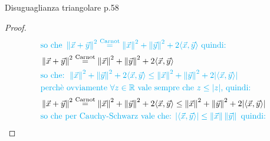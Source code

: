\documentclass{article}  %
\begin{document}
\begin{theorem}{Disuguaglianza triangolare p.58}
\begin{proof}
\begin{align*}
			 & \textcolor{cyan}{\text{so che }\left\|\vec{x}+\vec{y}\right\|^2 \overset{\text{Carnot}}{=} \left\|\vec{x}\right\|^2+\left\|\vec{y}\right\|^2+2\langle \vec{x}, \vec{y} \rangle}
			\textcolor{cyan}{\text{ quindi: }}                                                                                                                                                                                                                                                                                                                                                    \\
			 & \left\|\vec{x}+\vec{y}\right\|^2 \overset{\text{Carnot}}{=} \left\|\vec{x}\right\|^2+\left\|\vec{y}\right\|^2+2\langle \vec{x}, \vec{y} \rangle                                                                                                                                                                                                                                    \\
			 & \textcolor{cyan}{\text{so che: } \left\|\vec{x}\right\|^2+\left\|\vec{y}\right\|^2+2\langle \vec{x}, \vec{y} \rangle \leq \left\|\vec{x}\right\|^2+\left\|\vec{y}\right\|^2+2 |\langle \vec{x}, \vec{y} \rangle|}                                                                                                                                                                  \\
			 & \textcolor{cyan}{\text{perchè ovviamente } \forall{z} \in \mathbb{R} \text{ vale sempre che } z \leq |z| \text{, quindi:}}                                                                                                                                                                                                                                                         \\
			 & \left\|\vec{x}+\vec{y}\right\|^2 \overset{\text{Carnot}}{=} \left\|\vec{x}\right\|^2+\left\|\vec{y}\right\|^2+2\langle \vec{x}, \vec{y} \rangle \leq \left\|\vec{x}\right\|^2+\left\|\vec{y}\right\|^2+2 |\langle \vec{x}, \vec{y} \rangle|                                                                                                                                        \\
			 & \textcolor{cyan}{\text{so che per Cauchy-Schwarz vale che: } |\langle \vec{x}, \vec{y} \rangle| \leq \left\|\vec{x}\right\| \left\|\vec{y}\right\| \text{ quindi:}}                                                                                                                                                                                                                \\

\end{align*}
\end{proof}
\end{theorem}
\end{document}
